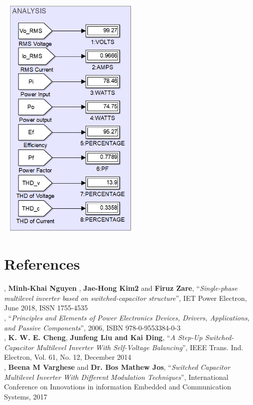 \documentclass[12pt,a4paper]{report}
\begin{document}
\begin{center}
	\includegraphics[width=7cm,height=12cm]{figures/SIMULINK_ANALYSIS}
\end{center}


\clearpage

\section*{References}

, {\bf Minh-Khai Nguyen} , {\bf Jae-Hong Kim2} and {\bf Firuz Zare}, “\textit{Single-phase multilevel inverter based on switched-capacitor structure}”, IET Power Electron, June 2018, ISSN 1755-4535\\

, “\textit{Principles and Elements of Power Electronics Devices, Drivers, Applications, and Passive Components}”, 2006, ISBN 978-0-9553384-0-3\\

, {\bf K. W. E. Cheng}, {\bf Junfeng Liu and Kai Ding}, “\textit{A Step-Up Switched-Capacitor Multilevel Inverter With Self-Voltage Balancing}”, IEEE Trans. Ind. Electron, Vol. 61, No. 12, December 2014\\

, {\bf Beena M Varghese} and {\bf Dr. Bos Mathew Jos}, “\textit{Switched Capacitor Multilevel Inverter With Different Modulation Techniques}”, International Conference on Innovations in information Embedded and Communication Systems, 2017\\


	
\end{document}
